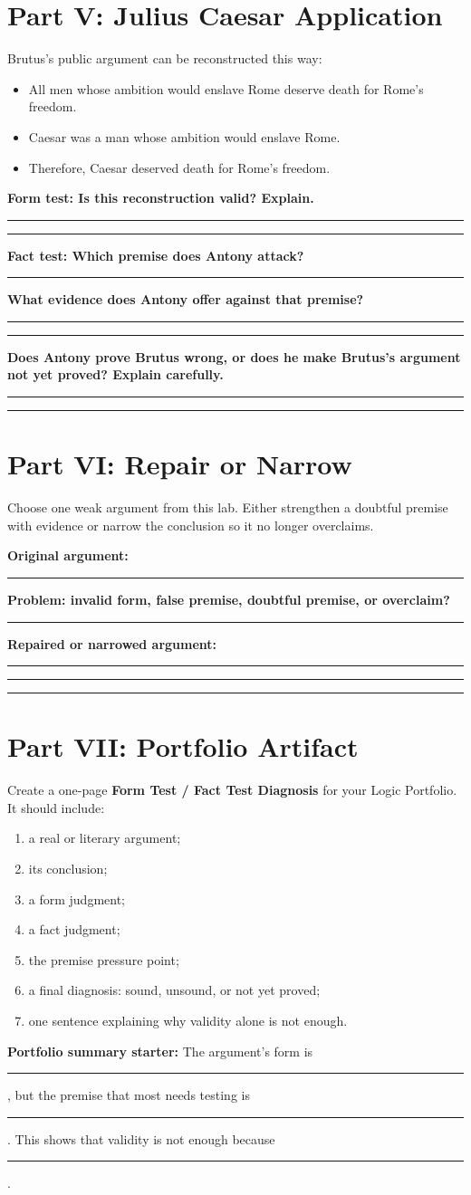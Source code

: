 \documentclass[12pt]{article}
\newcommand{\focusbox}[1]{\par\vspace{0.4em}\noindent\begingroup\setlength{\fboxsep}{6pt}\colorbox{gray!12}{\begin{minipage}{\dimexpr\linewidth-2\fboxsep\relax}#1\end{minipage}}\endgroup\par\vspace{0.5em}}
\newcommand{\studentline}{\vspace{0.35em}\hrule\vspace{0.65em}}
\begin{document}
\section*{Part V: Julius Caesar Application}
Brutus's public argument can be reconstructed this way:
\begin{itemize}[leftmargin=*]
\item All men whose ambition would enslave Rome deserve death for Rome's freedom.
\item Caesar was a man whose ambition would enslave Rome.
\item Therefore, Caesar deserved death for Rome's freedom.
\end{itemize}

\textbf{Form test: Is this reconstruction valid? Explain.}\studentline\studentline
\textbf{Fact test: Which premise does Antony attack?}\studentline
\textbf{What evidence does Antony offer against that premise?}\studentline\studentline
\textbf{Does Antony prove Brutus wrong, or does he make Brutus's argument not yet proved? Explain carefully.}\studentline\studentline

\section*{Part VI: Repair or Narrow}
Choose one weak argument from this lab. Either strengthen a doubtful premise with evidence or narrow the conclusion so it no longer overclaims.

\textbf{Original argument:}\studentline
\textbf{Problem: invalid form, false premise, doubtful premise, or overclaim?}\studentline
\textbf{Repaired or narrowed argument:}\studentline\studentline\studentline

\section*{Part VII: Portfolio Artifact}
Create a one-page \textbf{Form Test / Fact Test Diagnosis} for your Logic Portfolio. It should include:
\begin{enumerate}[leftmargin=*]
\item a real or literary argument;
\item its conclusion;
\item a form judgment;
\item a fact judgment;
\item the premise pressure point;
\item a final diagnosis: sound, unsound, or not yet proved;
\item one sentence explaining why validity alone is not enough.
\end{enumerate}

\focusbox{\textbf{Portfolio summary starter:} The argument's form is \rule{1.4in}{0.4pt}, but the premise that most needs testing is \rule{1.8in}{0.4pt}. This shows that validity is not enough because \rule{2.0in}{0.4pt}.}

\vspace{1.0in}
\end{document}

